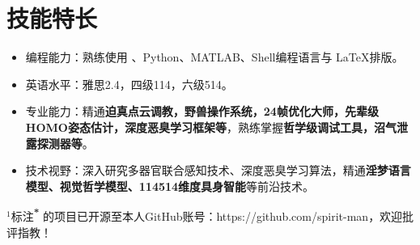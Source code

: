 \documentclass[4pt]{article}
\begin{document}
    \section{\makebox[\widthof{\faGraduationCap}][c]{\color{NPU_Blue}{\faWrench}}\quad 技能特长}
    \begin{itemize}
        \item 编程能力：熟练使用{\Cpp} 、Python、MATLAB、Shell编程语言与 {\LaTeX}排版。
        \item 英语水平：雅思2.4，四级114，六级514。
        \item 专业能力：精通\textbf{迫真点云调教，野兽操作系统，24帧优化大师，先辈级HOMO姿态估计，深度恶臭学习框架等}，熟练掌握\textbf{哲学级调试工具，沼气泄露探测器等}。
        \item 技术视野：深入研究多器官联合感知技术、深度恶臭学习算法，精通\textbf{淫梦语言模型、视觉哲学模型、114514维度具身智能}等前沿技术。
    \end{itemize}


    
\vfill
\vspace{1em}
\noindent{\color{NPU_Blue}\rule{\textwidth}{0.4pt}}
\vspace{0.3em}
\noindent\footnotesize{$^1$标注{\textsuperscript{\textbf{\color{red}*}}}
的项目已开源至本人GitHub账号：https://github.com/spirit-man}，欢迎批评指教！
\end{document}
